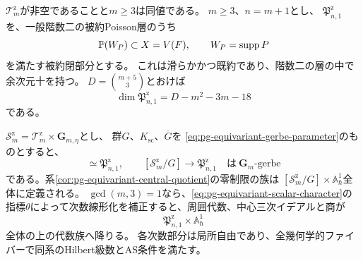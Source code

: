 \begin{proposition}[support平面が超曲面に含まれる層の量子化]
\label{prop:pg-equivariant-zero-stratum}
$\mathcal T_m^{\mathrm z}$が非空であることと$m\ge3$は同値である。
$m\ge3$、$n=m+1$とし、
$\mathfrak P_{n,1}^{\mathrm z}$を、一般階数二の被約Poisson層のうち
\begin{equation}
 \mathbb P(W_P)\subset X=V(F),\qquad W_P=\operatorname{supp}P
 \label{eq:pg-equivariant-contained-support-plane}
\end{equation}
を満たす被約閉部分とする。
これは滑らかかつ既約であり、階数二の層の中で余次元十を持つ。
$D=\binom{m+5}{3}$とおけば
\begin{equation}
 \dim\mathfrak P_{n,1}^{\mathrm z}=D-m^2-3m-18
 \label{eq:pg-equivariant-zero-stratum-dimension}
\end{equation}
である。

$\mathscr S_m^{\mathrm z}=\mathcal T_m^{\mathrm z}\times\mathbf G_{m,\eta}$とし、
群$G$、$K_{\mathrm{sc}}$、$\overline G$を
\eqref{eq:pg-equivariant-gerbe-parameter}のものとすると、
\begin{equation}
 [\mathscr S_m^{\mathrm z}/\overline G]\simeq\mathfrak P_{n,1}^{\mathrm z},
 \qquad
 [\mathscr S_m^{\mathrm z}/G]\longrightarrow\mathfrak P_{n,1}^{\mathrm z}
 \quad\text{は}\ \mathbf G_m\text{-gerbe}
 \label{eq:pg-equivariant-zero-gerbe}
\end{equation}
である。系\ref{cor:pg-equivariant-central-quotient}の零制限の族は
$[\mathscr S_m^{\mathrm z}/G]\times\mathbb A^1_\hbar$全体に定義される。
$\gcd(m,3)=1$なら、\eqref{eq:pg-equivariant-scalar-character}の
指標$\theta$によって次数線形化を補正すると、周囲代数、中心三次イデアルと商が
\begin{equation}
 \mathfrak P_{n,1}^{\mathrm z}\times\mathbb A^1_\hbar
 \label{eq:pg-equivariant-zero-descended-base}
\end{equation}
全体の上の代数族へ降りる。
各次数部分は局所自由であり、全幾何学的ファイバーで同系のHilbert級数とAS条件を満たす。
\end{proposition}
